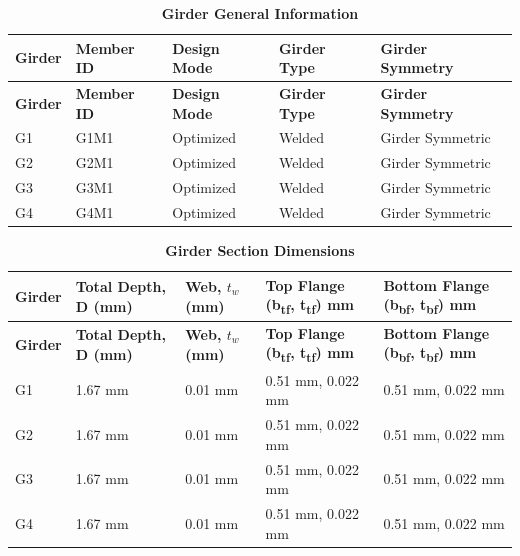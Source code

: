 \documentclass[12pt,a4paper]{report}
\numberwithin{table}{chapter}
\numberwithin{figure}{chapter}
\begin{document}
\newpage

\vspace{0.4em}
\noindent
            
\vspace{4pt}
\begin{longtable}{|L{2.2cm}|L{1.8cm}|p{3.8cm}|p{3.8cm}|p{3.8cm}|}
\caption{\textbf{Girder General Information}}
\hline
{} \textbf{Girder} & \textbf{Member ID} & \textbf{Design Mode} & \textbf{Girder Type} & \textbf{Girder Symmetry} \\[6pt]
\hline
\endfirsthead
\hline
{} \textbf{Girder} & \textbf{Member ID} & \textbf{Design Mode} & \textbf{Girder Type} & \textbf{Girder Symmetry} \\[6pt]
\hline
\endhead
G1 & G1M1 & Optimized & Welded & Girder Symmetric \\[8pt]
\hline
G2 & G2M1 & Optimized & Welded & Girder Symmetric \\[8pt]
\hline
G3 & G3M1 & Optimized & Welded & Girder Symmetric \\[8pt]
\hline
G4 & G4M1 & Optimized & Welded & Girder Symmetric \\[8pt]
\hline
\end{longtable}

\vspace{0.6em}

\vspace{4pt}
\begin{longtable}{|L{1.8cm}|L{2.3cm}|L{1.8cm}|p{4.8cm}|p{4.8cm}|}
\caption{\textbf{Girder Section Dimensions}}
\hline
{} \textbf{Girder} & \textbf{Total Depth, D (mm)} & \textbf{Web, $t_w$ (mm)} & \textbf{Top Flange (b\textsubscript{tf}, t\textsubscript{tf}) mm} & \textbf{Bottom Flange (b\textsubscript{bf}, t\textsubscript{bf}) mm} \\[6pt]
\hline
\endfirsthead
\hline
{} \textbf{Girder} & \textbf{Total Depth, D (mm)} & \textbf{Web, $t_w$ (mm)} & \textbf{Top Flange (b\textsubscript{tf}, t\textsubscript{tf}) mm} & \textbf{Bottom Flange (b\textsubscript{bf}, t\textsubscript{bf}) mm} \\[6pt]
\hline
\endhead
G1 & 1.67 mm & 0.01 mm & 0.51 mm, 0.022 mm & 0.51 mm, 0.022 mm \\[8pt]
\hline
G2 & 1.67 mm & 0.01 mm & 0.51 mm, 0.022 mm & 0.51 mm, 0.022 mm \\[8pt]
\hline
G3 & 1.67 mm & 0.01 mm & 0.51 mm, 0.022 mm & 0.51 mm, 0.022 mm \\[8pt]
\hline
G4 & 1.67 mm & 0.01 mm & 0.51 mm, 0.022 mm & 0.51 mm, 0.022 mm \\[8pt]
\hline
\end{longtable}
\end{document}
